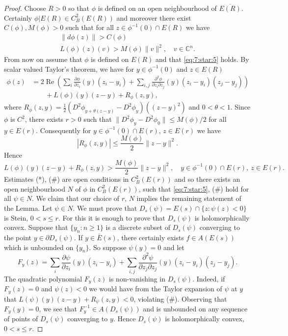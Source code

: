 \begin{proof}
Choose $R>0$ so that $\phi$ is defined on an open neighbourhood of $\overline{E(R)}$. Certainly $\phi|E(R)\in C_B^2(E(R))$ and moreover there exist $C(\phi),M(\phi)>0$ such that for all $z\in\phi^{-1}(0)\cap E(R)$ we have
\begin{gather*}
\|d\phi(z)\|>C(\phi)\tag{*}\label{eq:7:star:5}\\
L(\phi)(z)(v)>M(\phi)\|v\|^2,\quad v\in\mathbb C^n.
\end{gather*}
From now on assume that $\phi$ is defined on $E(R)$ and that \eqref{eq:7:star:5} holds. By scalar valued Taylor's theorem, we have for $y\in\phi^{-1}(0)$ and $z\in E(R)$
\[
\begin{split}
\phi(z)&=2\operatorname{Re}\left(\sum_i\frac{\partial\phi}{\partial z_i}(y)(z_i-y_i)+\sum_{i,j}\frac{\partial^2\phi}{\partial z_i\partial z_j}(y)(z_i-y_i)(z_j-y_j)\right)\\
&\qquad+L(\phi)(y)(z-y)+R_\phi(z,y),
\end{split}
\]
where $R_\phi(z,y)=\frac12(D^2\phi_{y+\theta(z-y)}-D^2\phi_y)((z-y)^2)$ and $0<\theta<1$. Since $\phi$ is $C^2$, there exists $r>0$ such that $\|D^2\phi_y-D^2\phi_0\|\leq M(\phi)/2$ for all $y\in E(r)$. Consequently for $y\in\phi^{-1}(0)\cap E(r)$, $z\in E(r)$ we have
\[
|R_\phi(z,y)|\leq\frac{M(\phi)}2\|z-y\|^2.
\]
Hence
\[
L(\phi)(y)(z-y)+R_\phi(z,y)>\frac{M(\phi)}2\|z-y\|^2,\quad y\in\phi^{-1}(0)\cap E(r),\ z\in E(r).\tag{\#}\label{eq:7:star:6}
\]
Estimates (*), (\#) are open conditions in $C_B^2(E(r))$ and so there exists an open neighbourhood $N$ of $\phi$ in $C_B^2(E(r))$, such that \eqref{eq:7:star:5}, (\#) hold for all $\psi\in N$. We claim that our choice of $r$, $N$ implies the remaining statement of the Lemma. Let $\psi\in N$. We must prove that $D_s(\psi)=E(s)\cap\{z:\psi(z)<0\}$ is Stein, $0<s\leq r$. For this it is enough to prove that $D_s(\psi)$ is holomorphically convex. Suppose that $\{y_n:n\geq1\}$ is a discrete subset of $D_s(\psi)$ converging to the point $y\in\partial D_s(\psi)$. If $y\in\bar E(s)$, there certainly exists $f\in A(E(s))$ which is unbounded on $\{y_n\}$. So suppose $\psi(y)=0$ and let
\[
F_y(z)=\sum_i\frac{\partial\psi}{\partial z_i}(y)(z_i-y_i)+\sum_{i,j}\frac{\partial^2\psi}{\partial z_j\partial z_j}(y)(z_i-y_i)(z_j-y_j).
\]
The quadratic polynomial $F_y(z)$ is non-vanishing in $D_s(\psi)$. Indeed, if $F_y(z)=0$ and $\psi(z)<0$ we would have from the Taylor expansion of $\psi$ at $y$ that $L(\psi)(y)(z-y)+R_\psi(z,y)<0$, violating (\#). Observing that $F_y(y)=0$, we see that $F_y^{-1}\in A(D_s(\psi))$ and is unbounded on any sequence of points of $D_s(\psi)$ converging to $y$. Hence $D_s(\psi)$ is holomorphically convex, $0<s\leq r$.
\end{proof}
